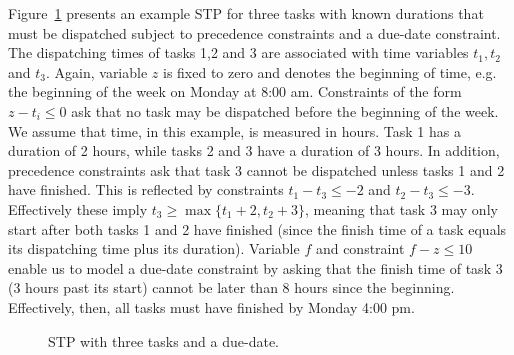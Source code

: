 	\begin{example}
		Figure~\ref{chapter:prelim-1:example-2} presents an example STP for three 
		tasks with known durations that must be dispatched subject to precedence constraints and a due-date constraint.
		The dispatching times of tasks 1,2 and 3 are associated with time variables $t_1,t_2$ and $t_3$.
		Again, variable $z$ is fixed to zero and denotes the beginning of time, 
		e.g. the beginning of the week on Monday at 8:00 am.
		Constraints of the form $z - t_i \leq 0$ ask that no task may be dispatched before the beginning of the week.
		We assume that time, in this example, is measured in hours. 
		Task 1 has a duration of 2 hours, while tasks 2 and 3 have a duration of 3 hours.
		In addition, precedence constraints ask that task 3 cannot be dispatched unless tasks 1 and 2 have finished.
		This is reflected by constraints $t_1 - t_3 \leq -2$ and $t_2 - t_3 \leq -3$.
		Effectively these imply $t_3 \geq \max\{t_1 + 2, t_2 + 3\}$,
		meaning that task 3 may only start after both tasks 1 and 2 have finished
		(since the finish time of a task equals its dispatching time plus its duration).
		Variable $f$ and constraint $f - z \leq 10$ enable us to model a due-date constraint 
		by asking that the finish time of task 3 (3 hours past its start) cannot be later than 8 hours since the beginning.
		Effectively, then, all tasks must have finished by Monday 4:00 pm.
	\end{example}

	\begin{figure}
		\centering
		\caption{STP with three tasks and a due-date.}
		\label{chapter:prelim-1:example-2}
	\end{figure}

